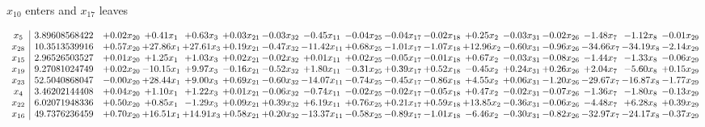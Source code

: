 \documentclass[9pt]{article}
\begin{document}
 $ x_{10} $ enters and $ x_{17} $ leaves 

 \[\begin{array}{c| c c@{\hskip 2pt} c@{\hskip 2pt} c@{\hskip 2pt} c@{\hskip 2pt} c@{\hskip 2pt} c@{\hskip 2pt} c@{\hskip 2pt} c@{\hskip 2pt} c@{\hskip 2pt} c@{\hskip 2pt} c@{\hskip 2pt} c@{\hskip 2pt} c@{\hskip 2pt} c@{\hskip 2pt} c@{\hskip 2pt} }
 x_{5}   &  3.89608568422 & +  0.02 x_{20} & +  0.41 x_{1} & +  0.63 x_{3} & +  0.03 x_{21} & -0.03 x_{32} & -0.45 x_{11} & -0.04 x_{25} & -0.04 x_{17} & -0.02 x_{18} & +  0.25 x_{2} & -0.03 x_{31} & -0.02 x_{26} & -1.48 x_{7} & -1.12 x_{8} & -0.01 x_{29}\\
 x_{28}   &  10.3513539916 & +  0.57 x_{20} & + 27.86 x_{1} & + 27.61 x_{3} & +  0.19 x_{21} & -0.47 x_{32} & -11.42 x_{11} & +  0.68 x_{25} & -1.01 x_{17} & -1.07 x_{18} & + 12.96 x_{2} & -0.60 x_{31} & -0.96 x_{26} & -34.66 x_{7} & -34.19 x_{8} & -2.14 x_{29}\\
 x_{15}   &  2.96526503527 & +  0.01 x_{20} & +  1.25 x_{1} & +  1.03 x_{3} & +  0.02 x_{21} & -0.02 x_{32} & +  0.01 x_{11} & +  0.02 x_{25} & -0.05 x_{17} & -0.01 x_{18} & +  0.67 x_{2} & -0.03 x_{31} & -0.08 x_{26} & -1.44 x_{7} & -1.33 x_{8} & -0.06 x_{29}\\
 x_{19}   &  9.27081024749 & +  0.02 x_{20} & -10.15 x_{1} & +  9.97 x_{3} & -0.16 x_{21} & -0.52 x_{32} & +  1.80 x_{11} & -0.31 x_{25} & +  0.39 x_{17} & +  0.52 x_{18} & -0.45 x_{2} & +  0.24 x_{31} & +  0.26 x_{26} & +  2.04 x_{7} & -5.60 x_{8} & +  0.15 x_{29}\\
 x_{23}   &  52.5040868047 & -0.00 x_{20} & + 28.44 x_{1} & +  9.00 x_{3} & +  0.69 x_{21} & -0.60 x_{32} & -14.07 x_{11} & -0.74 x_{25} & -0.45 x_{17} & -0.86 x_{18} & +  4.55 x_{2} & +  0.06 x_{31} & -1.20 x_{26} & -29.67 x_{7} & -16.87 x_{8} & -1.77 x_{29}\\
 x_{4}   &  3.46202144408 & +  0.04 x_{20} & +  1.10 x_{1} & +  1.22 x_{3} & +  0.01 x_{21} & -0.06 x_{32} & -0.74 x_{11} & -0.02 x_{25} & -0.02 x_{17} & -0.05 x_{18} & +  0.47 x_{2} & -0.02 x_{31} & -0.07 x_{26} & -1.36 x_{7} & -1.80 x_{8} & -0.13 x_{29}\\
 x_{22}   &  6.02071948336 & +  0.50 x_{20} & +  0.85 x_{1} & -1.29 x_{3} & +  0.09 x_{21} & +  0.39 x_{32} & +  6.19 x_{11} & +  0.76 x_{25} & +  0.21 x_{17} & +  0.59 x_{18} & + 13.85 x_{2} & -0.36 x_{31} & -0.06 x_{26} & -4.48 x_{7} & +  6.28 x_{8} & +  0.39 x_{29}\\
 x_{16}   &  49.7376236459 & +  0.70 x_{20} & + 16.51 x_{1} & + 14.91 x_{3} & +  0.58 x_{21} & +  0.20 x_{32} & -13.37 x_{11} & -0.58 x_{25} & -0.89 x_{17} & -1.01 x_{18} & -6.46 x_{2} & -0.30 x_{31} & -0.82 x_{26} & -32.97 x_{7} & -24.17 x_{8} & -0.37 x_{29}\\

\end{array}\]
\end{document}
